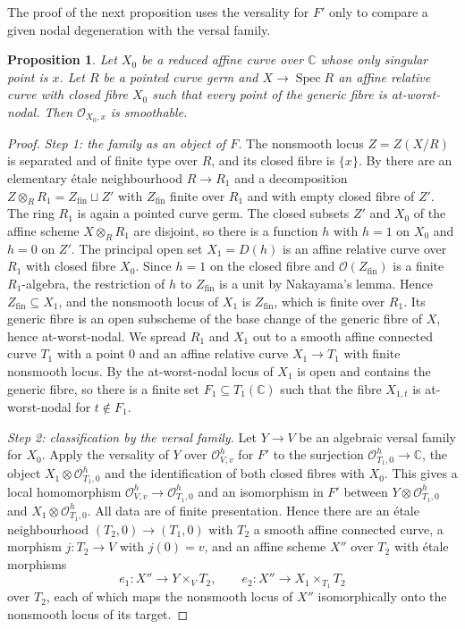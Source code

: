 \documentclass{amsart}
\newtheorem{proposition}[theorem]{Proposition}
\theoremstyle{definition}
\theoremstyle{remark}
\numberwithin{equation}{section}
\newcommand{\C}{\mathbb{C}}
\DeclareMathOperator{\Spec}{Spec}
\begin{document}
The proof of the next proposition uses the versality for $F'$ only to compare a given nodal degeneration with the versal family.

\begin{proposition}\label{prop:nodal}
Let $X_0$ be a reduced affine curve over $\C$ whose only singular point is $x$. Let $R$ be a pointed curve germ and $X\to\Spec R$ an affine relative curve with closed fibre $X_0$ such that every point of the generic fibre is at-worst-nodal. Then $\mathcal O_{X_0,x}$ is smoothable.
\end{proposition}

\begin{proof}
\emph{Step 1: the family as an object of $F$.} The nonsmooth locus $Z=Z(X/R)$ is separated and of finite type over $R$, and its closed fibre is $\{x\}$. By \cite[Lemma~37.41.4 (Tag~02LN)]{Sta} there are an elementary \'etale neighbourhood $R\to R_1$ and a decomposition $Z\otimes_RR_1=Z_{\mathrm{fin}}\sqcup Z'$ with $Z_{\mathrm{fin}}$ finite over $R_1$ and with empty closed fibre of $Z'$. The ring $R_1$ is again a pointed curve germ. The closed subsets $Z'$ and $X_0$ of the affine scheme $X\otimes_RR_1$ are disjoint, so there is a function $h$ with $h=1$ on $X_0$ and $h=0$ on $Z'$. The principal open set $X_1=D(h)$ is an affine relative curve over $R_1$ with closed fibre $X_0$. Since $h=1$ on the closed fibre and $\mathcal O(Z_{\mathrm{fin}})$ is a finite $R_1$-algebra, the restriction of $h$ to $Z_{\mathrm{fin}}$ is a unit by Nakayama's lemma. Hence $Z_{\mathrm{fin}}\subseteq X_1$, and the nonsmooth locus of $X_1$ is $Z_{\mathrm{fin}}$, which is finite over $R_1$. Its generic fibre is an open subscheme of the base change of the generic fibre of $X$, hence at-worst-nodal. We spread $R_1$ and $X_1$ out to a smooth affine connected curve $T_1$ with a point $0$ and an affine relative curve $X_1\to T_1$ with finite nonsmooth locus. By \cite[Lemma~53.20.5 (Tag~0DSC)]{Sta} the at-worst-nodal locus of $X_1$ is open and contains the generic fibre, so there is a finite set $F_1\subseteq T_1(\C)$ such that the fibre $X_{1,t}$ is at-worst-nodal for $t\notin F_1$.

\emph{Step 2: classification by the versal family.} Let $Y\to V$ be an algebraic versal family for $X_0$. Apply the versality of $Y$ over $\mathcal O^h_{V,v}$ for $F'$ to the surjection $\mathcal O^h_{T_1,0}\to\C$, the object $X_1\otimes\mathcal O^h_{T_1,0}$ and the identification of both closed fibres with $X_0$. This gives a local homomorphism $\mathcal O^h_{V,v}\to\mathcal O^h_{T_1,0}$ and an isomorphism in $F'$ between $Y\otimes\mathcal O^h_{T_1,0}$ and $X_1\otimes\mathcal O^h_{T_1,0}$. All data are of finite presentation. Hence there are an \'etale neighbourhood $(T_2,0)\to(T_1,0)$ with $T_2$ a smooth affine connected curve, a morphism $j\colon T_2\to V$ with $j(0)=v$, and an affine scheme $X''$ over $T_2$ with \'etale morphisms
\[
e_1\colon X''\to Y\times_VT_2,\qquad e_2\colon X''\to X_1\times_{T_1}T_2
\]
over $T_2$, each of which maps the nonsmooth locus of $X''$ isomorphically onto the nonsmooth locus of its target.


\end{proof}
\end{document}
